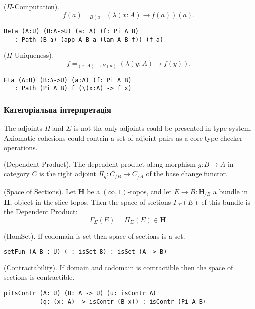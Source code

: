 \begin{theorem} ($\Pi$-Computation).
$$f(a) =_{B(a)} (\lambda (x:A) \rightarrow f(a))(a).$$
\begin{lstlisting}
Beta (A:U) (B:A->U) (a: A) (f: Pi A B)
   : Path (B a) (app A B a (lam A B f)) (f a)
\end{lstlisting}
\end{theorem}

\begin{theorem} ($\Pi$-Uniqueness).
$$f =_{(x:A)\rightarrow B(a)} (\lambda (y:A) \rightarrow f(y)).$$
\begin{lstlisting}
Eta (A:U) (B:A->U) (a:A) (f: Pi A B)
   : Path (Pi A B) f (\(x:A) -> f x)
\end{lstlisting}
\end{theorem}

\subsubsection*{Категоріальна інтерпретація}
The adjoints $\Pi$ and $\Sigma$ is not the only adjoints could be presented in type system.
Axiomatic cohesions could contain a set of adjoint pairs as a core type checker operations.

\begin{definition} (Dependent Product).
The dependent product along morphism $g: B \rightarrow A$ in category $C$ is the right
adjoint $\Pi_g : C_{/B} \rightarrow C_{/A}$ of the base change functor.
\end{definition}

\begin{definition} (Space of Sections).
Let $\mathbf{H}$ be a $(\infty,1)$-topos, and let $E \rightarrow B : \mathbf{H}_{/B}$ a bundle in
$\mathbf{H}$, object in the slice topos. Then the space of sections $\Gamma_\Sigma(E)$
of this bundle is the Dependent Product:
$$ \Gamma_\Sigma(E) = \Pi_\Sigma (E) \in \mathbf{H}. $$
\end{definition}

\begin{theorem} (HomSet).
If codomain is set then space of sections is a set.
\begin{lstlisting}
setFun (A B : U) (_: isSet B) : isSet (A -> B)
\end{lstlisting}
\end{theorem}

\begin{theorem} (Contractability).
If domain and codomain is contractible then the space of sections is contractible.
\begin{lstlisting}
piIsContr (A: U) (B: A -> U) (u: isContr A)
          (q: (x: A) -> isContr (B x)) : isContr (Pi A B)
\end{lstlisting}
\end{theorem}

